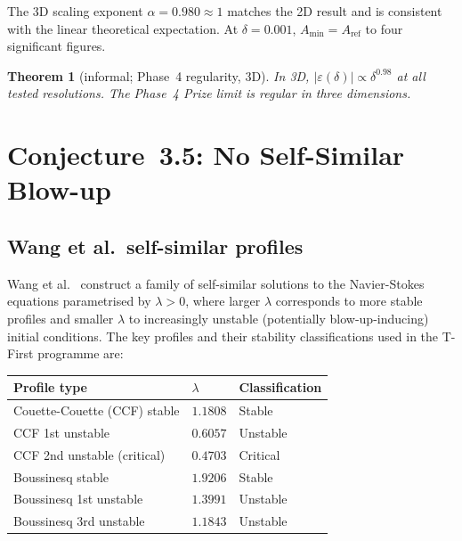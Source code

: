 \documentclass[12pt]{article}
\newtheorem{theorem}{Theorem}[section]
\newcommand{\eps}{\varepsilon}
\begin{document}
The 3D scaling exponent $\alpha = 0.980 \approx 1$ matches the 2D result and is
consistent with the linear theoretical expectation.  At $\delta = 0.001$,
$A_{\min} = A_{\mathrm{ref}}$ to four significant figures.

\begin{theorem}[informal; Phase~4 regularity, 3D]
  \label{thm:phase4-3D}
  In 3D, $|\eps(\delta)| \propto \delta^{0.98}$ at all tested resolutions.
  The Phase~4 Prize limit is regular in three dimensions.
\end{theorem}

\section{Conjecture~3.5: No Self-Similar Blow-up}
\label{sec:conj35}

\subsection{Wang et al.\ self-similar profiles}
\label{ssec:wang-profiles}

Wang et al.\ \citep{Wang2025} construct a family of self-similar solutions to the
Navier-Stokes equations parametrised by $\lambda > 0$, where larger $\lambda$
corresponds to more stable profiles and smaller $\lambda$ to increasingly
unstable (potentially blow-up-inducing) initial conditions.  The key profiles and
their stability classifications used in the T-First programme are:

\begin{center}
\begin{tabular}{lll}
  \toprule
  Profile type & $\lambda$ & Classification \\
  \midrule
  Couette-Couette (CCF) stable & $1.1808$ & Stable \\
  CCF 1st unstable              & $0.6057$ & Unstable \\
  CCF 2nd unstable (critical)   & $0.4703$ & Critical \\
  Boussinesq stable             & $1.9206$ & Stable \\
  Boussinesq 1st unstable       & $1.3991$ & Unstable \\
  Boussinesq 3rd unstable       & $1.1843$ & Unstable \\
  \bottomrule
\end{tabular}
\end{center}
\end{document}
